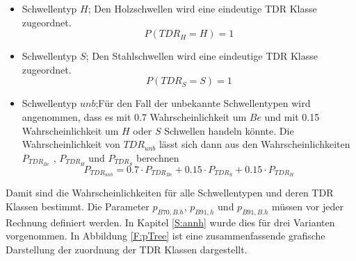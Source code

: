 \begin{itemize}
\item Schwellentyp $H$; Den Holzschwellen wird eine eindeutige TDR Klasse zugeordnet.
\begin{equation*}
	P(TDR_{H}=H)= 1
\end{equation*}
\item Schwellentyp $S$; Den Stahlschwellen wird eine eindeutige TDR Klasse zugeordnet.
\begin{equation*}
	P(TDR_{S}=S)=1
\end{equation*}
\item Schwellentyp $unb$;Für den Fall der unbekannte Schwellentypen wird angenommen, dass es mit 0.7 Wahrscheinlichkeit um $Be$  und mit 0.15 Wahrscheinlichkeit um  $H$ oder $S$ Schwellen handeln könnte. Die Wahrscheinlichkeit von $TDR_{unb}$ lässt sich dann aus den Wahrscheinlichkeiten $P_{TDR_{Be}}$ ,  $P_{TDR_{H}}$ und  $P_{TDR_{S}}$ berechnen
\begin{equation*}
	P_{TDR_{unb}}= 0.7\cdot P_{TDR_{Be}} + 0.15\cdot P_{TDR_{S}} + 0.15\cdot P_{TDR_{H}}
\end{equation*}
\end{itemize}
Damit sind die Wahrscheinlichkeiten für alle Schwellentypen und deren TDR Klassen bestimmt. Die Parameter $p_{B70,B.h}$, $p_{B91,h}$ und $ p_{B91,B.h}$ müssen vor jeder Rechnung definiert werden. In Kapitel \ref{S:annh} wurde dies für drei Varianten vorgenommen. In Abbildung \ref{F:pTree} ist eine zusammenfassende grafische Darstellung der zuordnung der TDR Klassen dargestellt. 
